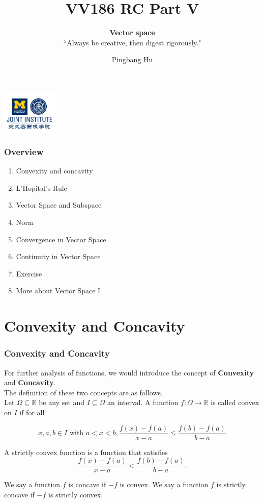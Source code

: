 \documentclass[12pt, t]{beamer}
\title{VV186 RC Part V}
\subtitle{\textbf{Vector space}\\``Always be creative, then digest rigorously."}
\institute[UM-SJTU JI]{University of Michigan-Shanghai Jiao Tong University Joint Institute}
\author{Pingbang Hu}
\begin{document}
\begin{frame}
    \titlepage
    \begin{center}
        \includegraphics[height=2cm]{Figures/logo/logo2.png}
    \end{center}
\end{frame}

\begin{frame}
    \frametitle{Overview}
    \begin{enumerate}
        \item Convexity and concavity
        \item L'Hopital's Rule
        \item Vector Space and Subspace
        \item Norm
        \item Convergence in Vector Space
        \item Continuity in Vector Space
        \item Exercise
        \item More about Vector Space I
    \end{enumerate}
\end{frame}

\section{Convexity and Concavity}
\begin{frame}
    \frametitle{Convexity and Concavity}

    For further analysis of functions, we would introduce the concept of \textbf{Convexity} and \textbf{Concavity}. \\
    The definition of these two concepts are as follows.\\

    \hspace{1em}
    Let $\Omega\subseteq\mathbb{R}$ be any set and $I\subseteq\Omega$ an interval. A function $f:\Omega\rightarrow\mathbb{R}$
    is called convex on $I$ if for all

    \begin{equation*}
        x, a, b\in I \text{ with } a<x<b, \frac{f(x)-f(a)}{x-a}\leq\frac{f(b)-f(a)}{b-a}
    \end{equation*}

    \vspace{0.5em}
    \hspace{1em}
    A strictly convex function is a function that satisfies
    \begin{equation}
        \frac{f(x)-f(a)}{x-a}<\frac{f(b)-f(a)}{b-a}.
    \end{equation}

    \hspace{1em}
    We say a function $f$ is concave if $-f$ is convex. We say a function $f$ is strictly concave if $-f$ is strictly convex.
\end{frame}
\end{document}
